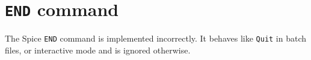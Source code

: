 \section{{\tt END} command}
The Spice {\tt END} command is implemented incorrectly.  It behaves like
{\tt Quit} in batch files, or interactive mode and is ignored otherwise.

